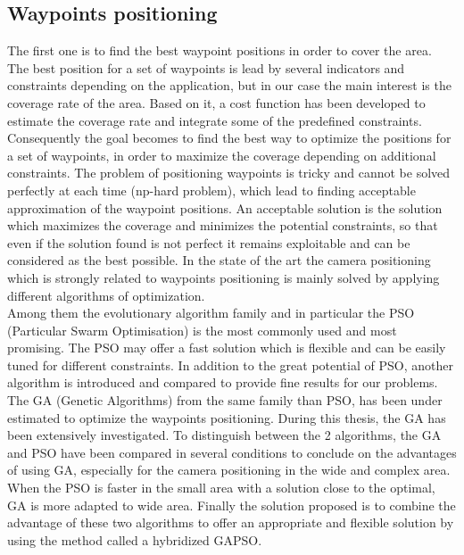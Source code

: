 \subsection{Waypoints positioning}
The first one is to find the best waypoint positions in order to cover the area. 
The best position for a set of waypoints is lead by several indicators and constraints depending on the application, but in our case the main interest is the coverage rate of the area. Based on it, a cost function has been developed to estimate the coverage rate and integrate some of the predefined constraints.\\
Consequently the goal becomes to find the best way to optimize the positions for a set of waypoints, in order to maximize the coverage depending on additional constraints. The problem of positioning waypoints is tricky and cannot be solved perfectly at each time (np-hard problem),  which lead to finding acceptable approximation of the waypoint positions.
An acceptable solution is the solution which maximizes the coverage and minimizes the potential constraints, so that even if the solution found is not perfect it remains exploitable and can be considered as the best possible.
In the state of the art the camera positioning which is  strongly related to waypoints positioning is mainly solved by applying different algorithms of optimization. \\ 
Among them the evolutionary algorithm family and in particular the PSO (Particular Swarm Optimisation) is the most commonly used and most promising.
 The PSO may offer a fast solution which is flexible and  can be easily tuned for different constraints.
  In addition  to the great potential of PSO, another algorithm is introduced and compared to provide fine results for our problems.
The GA (Genetic Algorithms) from the same family than PSO, has been under estimated to optimize the waypoints positioning. During this thesis, the GA has been extensively investigated. 
To distinguish between the 2 algorithms, the GA and PSO have been compared in several conditions to conclude on the advantages of using GA, especially for the camera positioning in the wide and complex area. When the PSO is faster in the small area with a solution close to the optimal, GA is more adapted to wide area.
Finally the solution proposed is to combine the advantage of these two algorithms to offer an appropriate and flexible solution by using the method called a hybridized GAPSO. 

